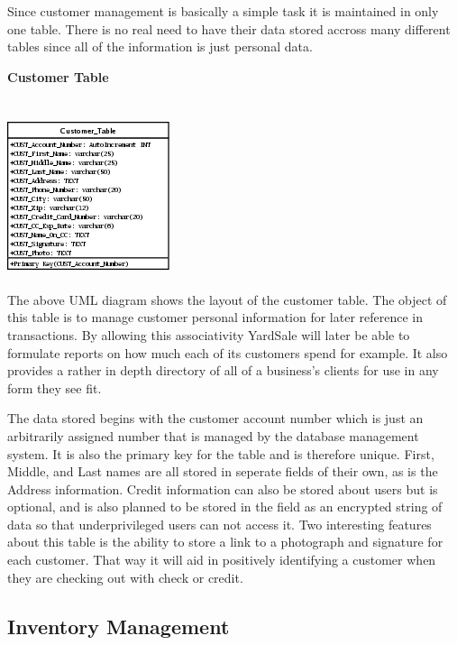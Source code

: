 \documentclass{report}
\begin{document}
    Since customer management is basically a simple task it is maintained in only
    one table. There is no real need to have their data stored accross many
    different tables since all of the information is just personal data.

    {\bf Customer Table}\\
    \\
    \\
    \includegraphics{Tables/CustomerTable.png}\\
    \\
    The above UML diagram shows the layout of the customer table. The object of this
    table is to manage customer personal information for later reference in
    transactions. By allowing this associativity YardSale will later be able to
    formulate reports on how much each of its customers spend for example. It also
    provides a rather in depth directory of all of a business's clients for use
    in any form they see fit.

    The data stored begins with the customer account number which is just an
    arbitrarily assigned number that is managed by the database management
    system. It is also the primary key for the table and is therefore unique.
    First, Middle, and Last names are all stored in seperate fields of their own,
    as is the Address information. Credit information can also be stored about users
    but is optional, and is also planned to be stored in the field as an encrypted
    string of data so that underprivileged users can not access it. Two interesting
    features about this table is the ability to store a link to a photograph and
    signature for each customer. That way it will aid in positively identifying a
    customer when they are checking out with check or credit.


    \newpage

    \subsection{Inventory Management}
\end{document}
